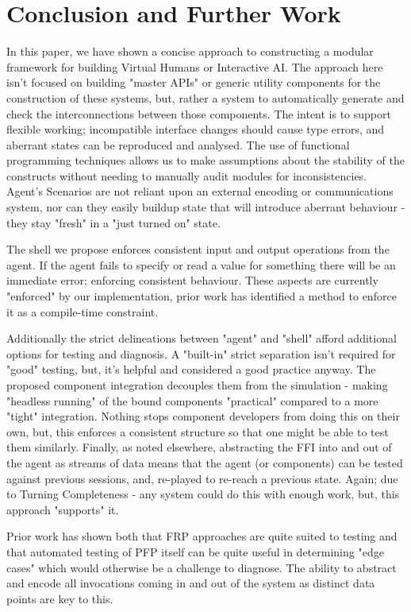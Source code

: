 
\section{Conclusion and Further Work}

In this paper, we have shown a concise approach to constructing a modular framework for building Virtual Humans or Interactive AI.
The approach here isn't focused on building "master APIs" or generic utility components for the construction of these systems, but, rather a system to automatically generate and check the interconnections between those components.
  The intent is to support flexible working; incompatible interface changes should cause type errors, and aberrant states can be reproduced and analysed.
  The use of functional programming techniques allows us to make assumptions about the stability of the constructs without needing to manually audit modules for inconsistencies.
Agent's Scenarios are not reliant upon an external encoding or communications system, nor can they easily buildup state that will introduce aberrant behaviour - they stay "fresh" in a "just turned on" state.

The shell we propose enforces consistent input and output operations from the agent.
  If the agent fails to specify or read a value for something there will be an immediate error; enforcing consistent behaviour.
These aspects are currently "enforced" by our implementation, prior work has identified a method to enforce it as a compile-time constraint.\cite{winograd2012wormholes}

Additionally the strict delineations between "agent" and "shell" afford additional options for testing and diagnosis.
  A "built-in" strict separation isn't required for "good" testing, but, it's helpful and considered a good practice anyway.
The proposed component integration decouples them from the simulation - making "headless running" of the bound components "practical" compared to a more "tight" integration.
  Nothing stops component developers from doing this on their own, but, this enforces a consistent structure so that one might be able to test them similarly.
Finally, as noted elsewhere, abstracting the FFI into and out of the agent as streams of data means that the agent (or components) can be tested against previous sessions, and, re-played to re-reach a previous state.
  Again; due to Turning Completeness - any system could do this with enough work, but, this approach "supports" it.

Prior work has shown both that FRP approaches are quite suited to testing\cite{perez2017testing} and that automated testing of PFP itself can be quite useful in determining "edge cases"\cite{claessen2011quickcheck} which would otherwise be a challenge to diagnose.
  The ability to abstract and encode all invocations coming in and out of the system as distinct data points are key to this.


